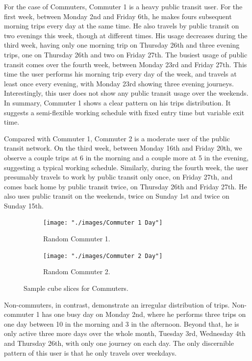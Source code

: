 \documentclass{article}
\begin{document}
For the case of Commuters, Commuter 1 is a heavy public transit user. For the first week, between Monday 2nd and Friday 6th, he makes fours subsequent morning trips every day at the same time. He also travels by public transit on two evenings this week, though at different times. His usage decreases during the third week, having only one morning trip on Thursday 26th and three evening trips, one on Thursday 26th and two on Friday 27th. The busiest usage of public transit comes over the fourth week, between Monday 23rd and Friday 27th. This time the user performs his morning trip every day of the week, and travels at least once every evening, with Monday 23rd showing three evening journeys. Interestingly, this user does not show any public transit usage over the weekends. In summary, Commuter 1 shows a clear pattern on his trips distribution. It suggests a semi-flexible working schedule with fixed entry time but variable exit time. 

Compared with Commuter 1, Commuter 2 is a moderate user of the public transit network. On the third week, between Monday 16th and Friday 20th, we observe a couple trips at 6 in the morning and a couple more at 5 in the evening, suggesting a typical working schedule. Similarly, during the fourth week, the user presumably travels to work by public transit only once, on Friday 27th, and comes back home by public transit twice, on Thursday 26th and Friday 27th. He also uses public transit on the weekends, twice on Sunday 1st and twice on Sunday 15th.

\begin{figure}[H]
  \centering
  \begin{subfigure}[b]{.45\textwidth}
  	\centering
	\texttt{[image: "./images/Commuter 1 Day"]}
  	\caption{Random Commuter 1.}
  \end{subfigure}
  \begin{subfigure}[b]{.45\textwidth}
  	\centering
	\texttt{[image: "./images/Commuter 2 Day"]}
  	\caption{Random Commuter 2.}
  \end{subfigure}
  \caption{Sample cube slices for Commuters.}
  	\label{fig:preprocessing/cubesCom} 
\end{figure}

Non-commuters, in contrast, demonstrate an irregular distribution of trips. Non-commuter 1 has one busy day on Monday 2nd, where he performs three trips on one day between 10 in the morning and 3 in the afternoon. Beyond that, he is only active three more days over the whole month, Tuesday 3rd, Wednesday 4th and Thursday 26th, with only one journey on each day. The only discernible pattern  of this user is that he only travels over weekdays.
\end{document}
